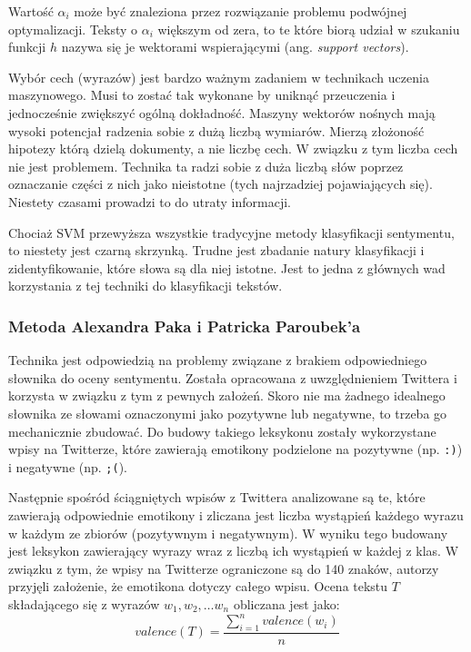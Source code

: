 Wartość $\alpha_i$ może być znaleziona przez rozwiązanie problemu podwójnej 
optymalizacji. Teksty o $\alpha_i$ większym od zera, to te które biorą udział
w szukaniu funkcji $h$ nazywa się je wektorami wspierającymi 
(ang. \textit{support vectors}).

Wybór cech (wyrazów) jest bardzo ważnym zadaniem w technikach uczenia maszynowego.
Musi to zostać tak wykonane by uniknąć przeuczenia i jednocześnie zwiększyć
ogólną dokładność. Maszyny wektorów nośnych mają wysoki potencjał radzenia
sobie z dużą liczbą wymiarów. Mierzą złożoność hipotezy którą dzielą dokumenty, 
a nie liczbę cech. W związku z tym liczba cech nie jest problemem.
Technika ta radzi sobie z duża liczbą słów poprzez oznaczanie części z nich jako
nieistotne (tych najrzadziej pojawiających się). Niestety czasami prowadzi to 
do utraty informacji. 

Chociaż SVM przewyższa wszystkie tradycyjne metody klasyfikacji sentymentu,
to niestety jest czarną skrzynką. Trudne jest zbadanie natury klasyfikacji i
zidentyfikowanie, które słowa są dla niej istotne. Jest to jedna z głównych wad
korzystania z tej techniki do klasyfikacji tekstów. 

\subsubsection{Metoda Alexandra Paka i Patricka Paroubek'a}
Technika jest odpowiedzią na problemy związane z brakiem odpowiedniego słownika
do oceny sentymentu. Została opracowana z uwzględnieniem Twittera i korzysta
w związku z tym z pewnych założeń. Skoro nie ma żadnego idealnego słownika
ze słowami oznaczonymi jako pozytywne lub negatywne, to trzeba go mechanicznie
zbudować. Do budowy takiego leksykonu zostały wykorzystane wpisy na Twitterze,
które zawierają emotikony podzielone na pozytywne (np. \texttt{:)}) i 
negatywne (np. \texttt{;(}). 

Następnie spośród ściągniętych wpisów z Twittera analizowane są te,
które zawierają odpowiednie emotikony i zliczana jest liczba wystąpień
każdego wyrazu w każdym ze zbiorów (pozytywnym i negatywnym).
W wyniku tego budowany jest leksykon zawierający wyrazy wraz z liczbą
ich wystąpień w każdej z klas.
W związku z tym, że wpisy na Twitterze ograniczone są do 140 znaków, autorzy przyjęli
założenie, że emotikona dotyczy całego wpisu. 
Ocena tekstu $T$ składającego się z wyrazów $w_1, w_2, \ldots w_n$ obliczana 
jest jako:
\begin{equation}
valence(T) = \frac{\sum\limits_{i = 1}^n valence(w_i)}{n}
\end{equation}

